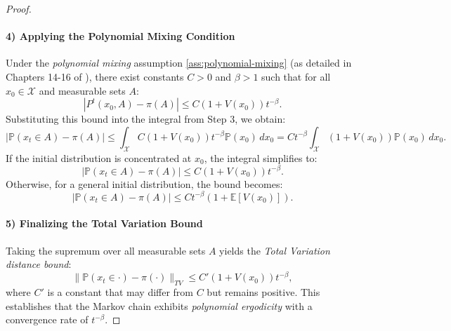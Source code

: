 \begin{proof}
\paragraph{4) Applying the Polynomial Mixing Condition}

Under the \emph{polynomial mixing} assumption \ref{ass:polynomial-mixing} (as detailed in Chapters 14-16 of \cite{meyn2012markov}), there exist constants \( C > 0 \) and \( \beta > 1 \) such that for all \( x_0 \in \mathcal{X} \) and measurable sets \( A \):
\[
|P^t(x_0, A) - \pi(A)| \leq C(1 + V(x_0)) t^{-\beta}.
\]
Substituting this bound into the integral from Step 3, we obtain:
\[
|\mathbb{P}(x_t \in A) - \pi(A)| \leq \int_{\mathcal{X}} C(1 + V(x_0)) t^{-\beta} \mathbb{P}(x_0) \, dx_0 = C t^{-\beta} \int_{\mathcal{X}} (1 + V(x_0)) \mathbb{P}(x_0) \, dx_0.
\]
If the initial distribution is concentrated at \( x_0 \), the integral simplifies to:
\[
|\mathbb{P}(x_t \in A) - \pi(A)| \leq C(1 + V(x_0)) t^{-\beta}.
\]
Otherwise, for a general initial distribution, the bound becomes:
\[
|\mathbb{P}(x_t \in A) - \pi(A)| \leq C t^{-\beta} \left(1 + \mathbb{E}[V(x_0)]\right).
\]

\paragraph{5) Finalizing the Total Variation Bound}

Taking the supremum over all measurable sets \( A \) yields the \emph{Total Variation distance bound}:
\[
\|\mathbb{P}(x_t \in \cdot) - \pi(\cdot)\|_{TV} \leq C' (1 + V(x_0)) t^{-\beta},
\]
where \( C' \) is a constant that may differ from \( C \) but remains positive. This establishes that the Markov chain exhibits \emph{polynomial ergodicity} with a convergence rate of \( t^{-\beta} \).

\end{proof}